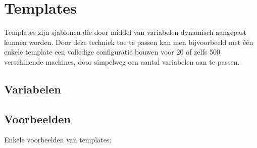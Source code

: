 \chapter{Templates}

Templates zijn sjablonen die door middel van variabelen dynamisch aangepast kunnen worden. Door deze techniek toe te passen kan men bijvoorbeeld met \'{e}\'{e}n enkele template een volledige configuratie bouwen voor 20 of zelfs 500 verschillende machines, door simpelweg een aantal variabelen aan te passen.

\section{Variabelen}

\section{Voorbeelden}

Enkele voorbeelden van templates:\\


